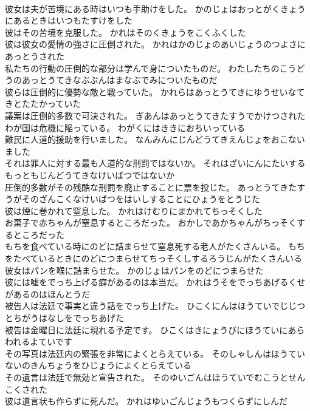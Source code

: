 \documentclass[8pt]{extreport}
\begin{document}
\begin{CJK}{UTF8}{min}
\\	彼女は夫が苦境にある時はいつも手助けをした。	かのじょはおっとがくきょうにあるときはいつもたすけをした 
\\	彼はその苦境を克服した。	かれはそのくきょうをこくふくした 
\\	彼は彼女の愛情の強さに圧倒された。	かれはかのじょのあいじょうのつよさにあっとうされた 
\\	私たちの行動の圧倒的な部分は学んで身についたものだ。	わたしたちのこうどうのあっとうてきなぶぶんはまなぶでみについたものだ 
\\	彼らは圧倒的に優勢な敵と戦っていた。	かれらはあっとうてきにゆうせいなてきとたたかっていた 
\\	議案は圧倒的多数で可決された。	ぎあんはあっとうてきたすうでかけつされた 
\\	わが国は危機に陥っている。	わがくにはききにおちいっている 
\\	難民に人道的援助を行いました。	なんみんにじんどうてきえんじょをおこないました 
\\	それは罪人に対する最も人道的な刑罰ではないか。	それはざいにんにたいするもっともじんどうてきなけいばつではないか 
\\	圧倒的多数がその残酷な刑罰を廃止することに票を投じた。	あっとうてきたすうがそのざんこくなけいばつをはいしすることにひょうをとうじた 
\\	彼は煙に巻かれて窒息した。	かれはけむりにまかれてちっそくした 
\\	お菓子で赤ちゃんが窒息するところだった。	おかしであかちゃんがちっそくするところだった 
\\	もちを食べている時にのどに詰まらせて窒息死する老人がたくさんいる。	もちをたべているときにのどにつまらせてちっそくしするろうじんがたくさんいる 
\\	彼女はパンを喉に詰まらせた。	かのじょはパンをのどにつまらせた 
\\	彼には嘘をでっち上げる癖があるのは本当だ。	かれはうそをでっちあげるくせがあるのはほんとうだ 
\\	被告人は法廷で事実と違う話をでっち上げた。	ひこくにんはほうていでじじつとちがうはなしをでっちあげた 
\\	被告は金曜日に法廷に現れる予定です。	ひこくはきにょうびにほうていにあらわれるよていです 
\\	その写真は法廷内の緊張を非常によくとらえている。	そのしゃしんはほうていないのきんちょうをひじょうによくとらえている 
\\	その遺言は法廷で無効と宣告された。	そのゆいごんはほうていでむこうとせんこくされた 
\\	彼は遺言状も作らずに死んだ。	かれはゆいごんじょうもつくらずにしんだ 

\end{CJK}
\end{document}
